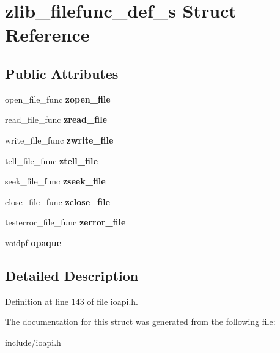 \hypertarget{structzlib__filefunc__def__s}{\section{zlib\-\_\-filefunc\-\_\-def\-\_\-s Struct Reference}
\label{structzlib__filefunc__def__s}
}
\subsection*{Public Attributes}
\begin{DoxyCompactItemize}
\item 
\hypertarget{structzlib__filefunc__def__s_a49b78a559140e495b94af4d9dfe5c4e9}{open\-\_\-file\-\_\-func {\bfseries zopen\-\_\-file}}\label{structzlib__filefunc__def__s_a49b78a559140e495b94af4d9dfe5c4e9}

\item 
\hypertarget{structzlib__filefunc__def__s_ab14f748de7516525e5d2b78c47aca92e}{read\-\_\-file\-\_\-func {\bfseries zread\-\_\-file}}\label{structzlib__filefunc__def__s_ab14f748de7516525e5d2b78c47aca92e}

\item 
\hypertarget{structzlib__filefunc__def__s_a710b490fec793486ef5bedd9f2e1136d}{write\-\_\-file\-\_\-func {\bfseries zwrite\-\_\-file}}\label{structzlib__filefunc__def__s_a710b490fec793486ef5bedd9f2e1136d}

\item 
\hypertarget{structzlib__filefunc__def__s_ac8b933601443cdd83f8cc02004c77d0d}{tell\-\_\-file\-\_\-func {\bfseries ztell\-\_\-file}}\label{structzlib__filefunc__def__s_ac8b933601443cdd83f8cc02004c77d0d}

\item 
\hypertarget{structzlib__filefunc__def__s_a4747bdf97a3f44fe4b958114c11e1dcf}{seek\-\_\-file\-\_\-func {\bfseries zseek\-\_\-file}}\label{structzlib__filefunc__def__s_a4747bdf97a3f44fe4b958114c11e1dcf}

\item 
\hypertarget{structzlib__filefunc__def__s_ac46ac7ec0540dce117dab3f210d26763}{close\-\_\-file\-\_\-func {\bfseries zclose\-\_\-file}}\label{structzlib__filefunc__def__s_ac46ac7ec0540dce117dab3f210d26763}

\item 
\hypertarget{structzlib__filefunc__def__s_a61182b5b3ff83fb509b57ab4d2d9816d}{testerror\-\_\-file\-\_\-func {\bfseries zerror\-\_\-file}}\label{structzlib__filefunc__def__s_a61182b5b3ff83fb509b57ab4d2d9816d}

\item 
\hypertarget{structzlib__filefunc__def__s_a494b6d634b61bdc7fc7caed8e4fbe3f4}{voidpf {\bfseries opaque}}\label{structzlib__filefunc__def__s_a494b6d634b61bdc7fc7caed8e4fbe3f4}

\end{DoxyCompactItemize}


\subsection{Detailed Description}


Definition at line 143 of file ioapi.\-h.



The documentation for this struct was generated from the following file\-:\begin{DoxyCompactItemize}
\item 
include/ioapi.\-h\end{DoxyCompactItemize}
